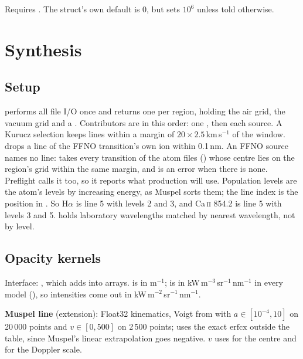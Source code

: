 Requires . The struct's own default  is 0, but  sets $10^6$ unless told otherwise.

\section{Synthesis}

\subsection{Setup}
 performs all file I/O once and returns one  per region, holding the air grid, the vacuum grid and a . Contributors are in this order: one , then each source. A Kurucz selection keeps lines within a margin of $20\times2.5$\,km\,s$^{-1}$ of the window.  drops a line of the FFNO transition's own ion within 0.1\,nm. An FFNO source names no line:  takes every transition of the atom files () whose centre lies on the region's grid within the same margin, and is an error when there is none. Preflight calls it too, so it reports what production will use. Population levels are the atom's levels by increasing energy, as Muspel sorts them; the line index is the position in . So H$\alpha$ is line 5 with levels 2 and 3, and Ca\,\textsc{ii} 854.2 is line 5 with levels 3 and 5.  holds laboratory wavelengths matched by nearest wavelength, not by level.

\subsection{Opacity kernels}
Interface: , which adds into  arrays.  is in m$^{-1}$;  is in kW\,m$^{-3}$\,sr$^{-1}$\,nm$^{-1}$ in every model (), so intensities come out in kW\,m$^{-2}$\,sr$^{-1}$\,nm$^{-1}$.

\textbf{Muspel line} (extension): Float32 kinematics, Voigt from  with $a\in[10^{-4},10]$ on 20\,000 points and $v\in[0,500]$ on 2\,500 points;  uses the exact $\mathrm{erfcx}$ outside the table, since Muspel's linear extrapolation goes negative. $v$ uses  for the centre and  for the Doppler scale.

